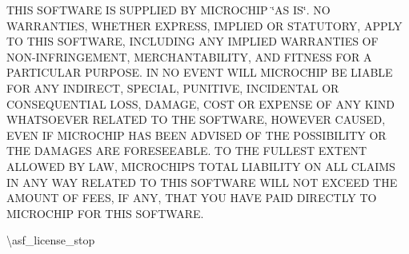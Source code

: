 T\+H\+IS S\+O\+F\+T\+W\+A\+RE IS S\+U\+P\+P\+L\+I\+ED BY M\+I\+C\+R\+O\+C\+H\+IP \char`\"{}\+A\+S I\+S\char`\"{}. NO W\+A\+R\+R\+A\+N\+T\+I\+ES, W\+H\+E\+T\+H\+ER E\+X\+P\+R\+E\+SS, I\+M\+P\+L\+I\+ED OR S\+T\+A\+T\+U\+T\+O\+RY, A\+P\+P\+LY TO T\+H\+IS S\+O\+F\+T\+W\+A\+RE, I\+N\+C\+L\+U\+D\+I\+NG A\+NY I\+M\+P\+L\+I\+ED W\+A\+R\+R\+A\+N\+T\+I\+ES OF N\+O\+N-\/\+I\+N\+F\+R\+I\+N\+G\+E\+M\+E\+NT, M\+E\+R\+C\+H\+A\+N\+T\+A\+B\+I\+L\+I\+TY, A\+ND F\+I\+T\+N\+E\+SS F\+OR A P\+A\+R\+T\+I\+C\+U\+L\+AR P\+U\+R\+P\+O\+SE. IN NO E\+V\+E\+NT W\+I\+LL M\+I\+C\+R\+O\+C\+H\+IP BE L\+I\+A\+B\+LE F\+OR A\+NY I\+N\+D\+I\+R\+E\+CT, S\+P\+E\+C\+I\+AL, P\+U\+N\+I\+T\+I\+VE, I\+N\+C\+I\+D\+E\+N\+T\+AL OR C\+O\+N\+S\+E\+Q\+U\+E\+N\+T\+I\+AL L\+O\+SS, D\+A\+M\+A\+GE, C\+O\+ST OR E\+X\+P\+E\+N\+SE OF A\+NY K\+I\+ND W\+H\+A\+T\+S\+O\+E\+V\+ER R\+E\+L\+A\+T\+ED TO T\+HE S\+O\+F\+T\+W\+A\+RE, H\+O\+W\+E\+V\+ER C\+A\+U\+S\+ED, E\+V\+EN IF M\+I\+C\+R\+O\+C\+H\+IP H\+AS B\+E\+EN A\+D\+V\+I\+S\+ED OF T\+HE P\+O\+S\+S\+I\+B\+I\+L\+I\+TY OR T\+HE D\+A\+M\+A\+G\+ES A\+RE F\+O\+R\+E\+S\+E\+E\+A\+B\+LE. TO T\+HE F\+U\+L\+L\+E\+ST E\+X\+T\+E\+NT A\+L\+L\+O\+W\+ED BY L\+AW, M\+I\+C\+R\+O\+C\+H\+IP\textquotesingle{}S T\+O\+T\+AL L\+I\+A\+B\+I\+L\+I\+TY ON A\+LL C\+L\+A\+I\+MS IN A\+NY W\+AY R\+E\+L\+A\+T\+ED TO T\+H\+IS S\+O\+F\+T\+W\+A\+RE W\+I\+LL N\+OT E\+X\+C\+E\+ED T\+HE A\+M\+O\+U\+NT OF F\+E\+ES, IF A\+NY, T\+H\+AT Y\+OU H\+A\+VE P\+A\+ID D\+I\+R\+E\+C\+T\+LY TO M\+I\+C\+R\+O\+C\+H\+IP F\+OR T\+H\+IS S\+O\+F\+T\+W\+A\+RE.

\textbackslash{}asf\+\_\+license\+\_\+stop \begin{DoxyVerb}\end{DoxyVerb}
 